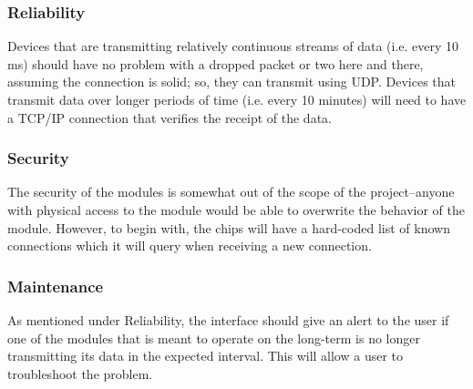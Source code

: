 \documentclass[onecolumn, draftclsnofoot,10pt, compsoc]{IEEEtran}
\begin{document}
\subsubsection{Reliability}
Devices that are transmitting relatively continuous streams of data (i.e. every 10 ms) should have no problem with a dropped packet or two here and there, assuming the connection is solid; so, they can transmit using UDP. Devices that transmit data over longer periods of time (i.e. every 10 minutes) will need to have a TCP/IP connection that verifies the receipt of the data.
\subsubsection{Security}
The security of the modules is somewhat out of the scope of the project--anyone with physical access to the module would be able to overwrite the behavior of the module. However, to begin with, the chips will have a hard-coded list of known connections which it will query when receiving a new connection.

\subsubsection{Maintenance}
As mentioned under Reliability, the interface should give an alert to the user if one of the modules that is meant to operate on the long-term is no longer transmitting its data in the expected interval. This will allow a user to troubleshoot the problem.

\newpage

\noindent{}
\end{document}
